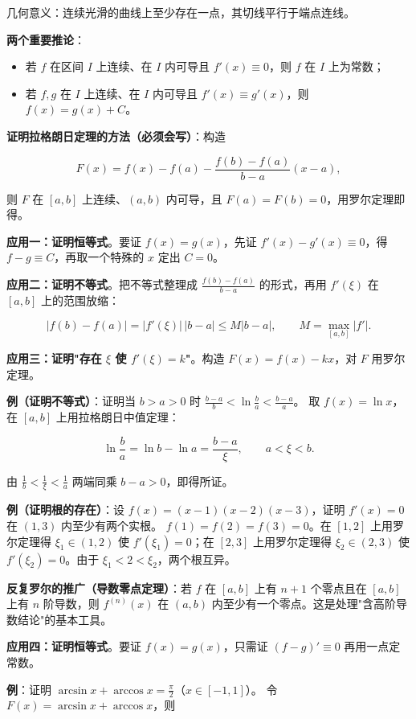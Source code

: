 \documentclass[11pt,openany,UTF8]{ctexbook}
\begin{document}
几何意义：连续光滑的曲线上至少存在一点，其切线平行于端点连线。

\textbf{两个重要推论}：

\begin{itemize}
\item 若 $f$ 在区间 $I$ 上连续、在 $I$ 内可导且 $f'(x)\equiv0$，则 $f$ 在 $I$ 上为常数；
\item 若 $f,g$ 在 $I$ 上连续、在 $I$ 内可导且 $f'(x)\equiv g'(x)$，则 $f(x)=g(x)+C$。
\end{itemize}
\textbf{证明拉格朗日定理的方法（必须会写）}：构造

\[F(x)=f(x)-f(a)-\frac{f(b)-f(a)}{b-a}(x-a),\]

则 $F$ 在 $[a,b]$ 上连续、$(a,b)$ 内可导，且 $F(a)=F(b)=0$，用罗尔定理即得。

\textbf{应用一：证明恒等式}。要证 $f(x)=g(x)$，先证 $f'(x)-g'(x)\equiv0$，得 $f-g\equiv C$，再取一个特殊的 $x$ 定出 $C=0$。

\textbf{应用二：证明不等式}。把不等式整理成 $\frac{f(b)-f(a)}{b-a}$ 的形式，再用 $f'(\xi)$ 在 $[a,b]$ 上的范围放缩：

\[\vert f(b)-f(a)\vert=\vert f'(\xi)\vert\,\vert b-a\vert\le M\vert b-a\vert,\qquad M=\max_{[a,b]}\vert f'\vert .\]

\textbf{应用三：证明"存在 $\xi$ 使 $f'(\xi)=k$"}。构造 $F(x)=f(x)-kx$，对 $F$ 用罗尔定理。

\textbf{例（证明不等式）}：证明当 $b>a>0$ 时 $\frac{b-a}{b}<\ln\frac ba<\frac{b-a}{a}$。 取 $f(x)=\ln x$，在 $[a,b]$ 上用拉格朗日中值定理：

\[\ln\frac ba=\ln b-\ln a=\frac{b-a}{\xi},\qquad a<\xi<b .\]

由 $\frac{1}{b}<\frac{1}{\xi}<\frac{1}{a}$ 两端同乘 $b-a>0$，即得所证。

\textbf{例（证明根的存在）}：设 $f(x)=(x-1)(x-2)(x-3)$，证明 $f'(x)=0$ 在 $(1,3)$ 内至少有两个实根。 $f(1)=f(2)=f(3)=0$。在 $[1,2]$ 上用罗尔定理得 $\xi_1\in(1,2)$ 使 $f'(\xi_1)=0$；在 $[2,3]$ 上用罗尔定理得 $\xi_2\in(2,3)$ 使 $f'(\xi_2)=0$。由于 $\xi_1<2<\xi_2$，两个根互异。

\textbf{反复罗尔的推广（导数零点定理）}：若 $f$ 在 $[a,b]$ 上有 $n+1$ 个零点且在 $[a,b]$ 上有 $n$ 阶导数，则 $f^{(n)}(x)$ 在 $(a,b)$ 内至少有一个零点。这是处理"含高阶导数结论"的基本工具。

\textbf{应用四：证明恒等式}。要证 $f(x)=g(x)$，只需证 $(f-g)'\equiv0$ 再用一点定常数。

\textbf{例}：证明 $\arcsin x+\arccos x=\frac{\pi}{2}$（$x\in[-1,1]$）。 令 $F(x)=\arcsin x+\arccos x$，则
\end{document}
